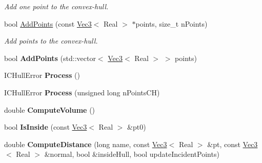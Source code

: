 \begin{DoxyCompactItemize}
\begin{DoxyCompactList}\small\item\em Add one point to the convex-\/hull. \end{DoxyCompactList}\item 
\hypertarget{class_h_a_c_d_1_1_i_c_hull_af08031446ed1c44fd59f55ea9b9175de}{bool \hyperlink{class_h_a_c_d_1_1_i_c_hull_af08031446ed1c44fd59f55ea9b9175de}{Add\+Points} (const \hyperlink{class_h_a_c_d_1_1_vec3}{Vec3}$<$ Real $>$ $\ast$points, size\+\_\+t n\+Points)}\label{class_h_a_c_d_1_1_i_c_hull_af08031446ed1c44fd59f55ea9b9175de}

\begin{DoxyCompactList}\small\item\em Add points to the convex-\/hull. \end{DoxyCompactList}\item 
\hypertarget{class_h_a_c_d_1_1_i_c_hull_a0cfac88bb7d0ed2d8957ea9b33268745}{bool {\bfseries Add\+Points} (std\+::vector$<$ \hyperlink{class_h_a_c_d_1_1_vec3}{Vec3}$<$ Real $>$ $>$ points)}\label{class_h_a_c_d_1_1_i_c_hull_a0cfac88bb7d0ed2d8957ea9b33268745}

\item 
\hypertarget{class_h_a_c_d_1_1_i_c_hull_a7b64673e5711756644f6cd80e701abdd}{I\+C\+Hull\+Error {\bfseries Process} ()}\label{class_h_a_c_d_1_1_i_c_hull_a7b64673e5711756644f6cd80e701abdd}

\item 
\hypertarget{class_h_a_c_d_1_1_i_c_hull_a1d73c5969fd3eee8ed75dab84c4da5f0}{I\+C\+Hull\+Error {\bfseries Process} (unsigned long n\+Points\+C\+H)}\label{class_h_a_c_d_1_1_i_c_hull_a1d73c5969fd3eee8ed75dab84c4da5f0}

\item 
\hypertarget{class_h_a_c_d_1_1_i_c_hull_ab8ca6a94e54edd90e5320ceb7a81b3f0}{double {\bfseries Compute\+Volume} ()}\label{class_h_a_c_d_1_1_i_c_hull_ab8ca6a94e54edd90e5320ceb7a81b3f0}

\item 
\hypertarget{class_h_a_c_d_1_1_i_c_hull_aa306f9bed82615af7342b32886c56bde}{bool {\bfseries Is\+Inside} (const \hyperlink{class_h_a_c_d_1_1_vec3}{Vec3}$<$ Real $>$ \&pt0)}\label{class_h_a_c_d_1_1_i_c_hull_aa306f9bed82615af7342b32886c56bde}

\item 
\hypertarget{class_h_a_c_d_1_1_i_c_hull_a3b493ea1219940ee4a61abc363ce194b}{double {\bfseries Compute\+Distance} (long name, const \hyperlink{class_h_a_c_d_1_1_vec3}{Vec3}$<$ Real $>$ \&pt, const \hyperlink{class_h_a_c_d_1_1_vec3}{Vec3}$<$ Real $>$ \&normal, bool \&inside\+Hull, bool update\+Incident\+Points)}\label{class_h_a_c_d_1_1_i_c_hull_a3b493ea1219940ee4a61abc363ce194b}


\end{DoxyCompactItemize}
